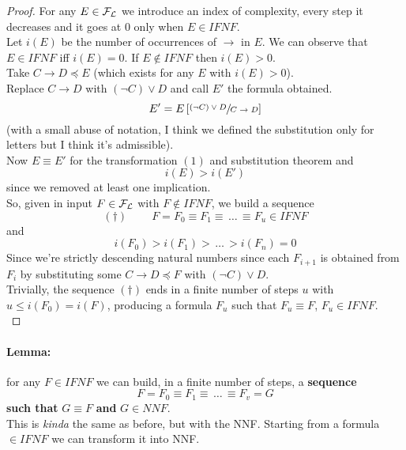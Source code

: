 \documentclass[11pt]{article}
\begin{document}
	\begin{proof}
		For any $E \in \mathcal{F}_\mathcal{L}$ we introduce an index of complexity, every step it decreases and it goes at 0 only when $E \in IFNF$.\\
		
		Let $i(E)$ be the number of occurrences of $\rightarrow$ in $E$. We can observe that $E \in IFNF$ iff $i(E) = 0$. If $E \notin IFNF$ then $i(E) > 0$.\\
		
		Take $C \rightarrow D \preceq E$ (which exists for any $E$ with $i(E) > 0$).\\
		
		Replace $C \rightarrow D$ with $(\neg C) \vee D$ and call $E'$ the formula obtained.\\
		$$ E' = E\left[\sfrac{(\neg C) \vee D}{C \rightarrow D}\right]$$
		(with a small abuse of notation, I think we defined the substitution only for letters but I think it's admissible).\\
		
		Now $E \equiv E'$ for the transformation $(1)$ and substitution theorem and 
		$$ i(E) > i(E')$$
		since we removed at least one implication.\\
		
		So, given in input $F \in \mathcal{F}_\mathcal{L}$ with $F \notin IFNF$, we build a sequence 
		$$ (\dag) \;\;\;\;\;\;\;\; F = F_0 \equiv F_1\equiv \, \dots \, \equiv F_u \in IFNF $$
		and 
		$$ i(F_0) > i(F_1) > \, \dots \, > i(F_n) = 0 $$
		Since we're strictly descending natural numbers since each $F_{i+1}$ is obtained from $F_i$ by substituting some $C \rightarrow D \preceq F$ with $(\neg C) \vee D$.\\
		
		Trivially, the sequence $(\dag)$ ends in a finite number of steps $u$ with $u \leq i(F_0) = i(F)$, producing a formula $F_u$ such that $F_u \equiv F$, $F_u \in IFNF$.\\
	\end{proof}
	
	\paragraph{Lemma:} for any $F \in IFNF$ we can build, in a finite number of steps, a \textbf{sequence} 
	$$ F = F_0 \equiv F_1 \equiv \, \dots \, \equiv F_v = G $$
	\textbf{such that} $G \equiv F$ \textbf{and} $G \in NNF$.\\
	This is \textit{kinda} the same as before, but with the NNF. Starting from a formula $\in IFNF$ we can transform it into NNF.\\
	
\end{document}
